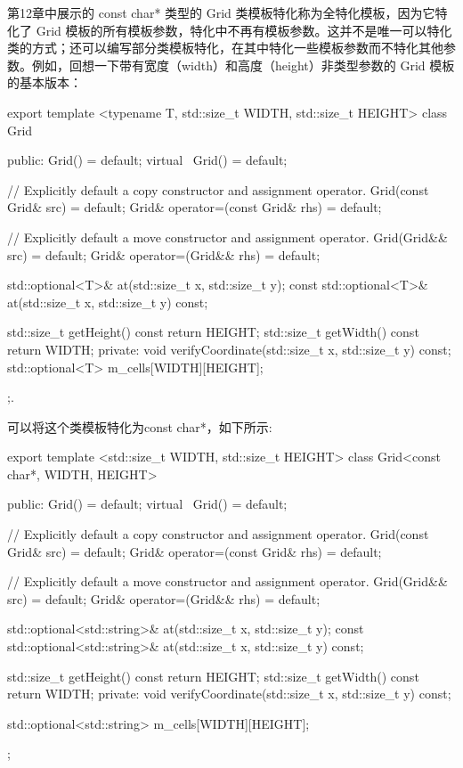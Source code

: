 第12章中展示的 const char* 类型的 Grid 类模板特化称为全特化模板，因为它特化了 Grid 模板的所有模板参数，特化中不再有模板参数。这并不是唯一可以特化类的方式；还可以编写部分类模板特化，在其中特化一些模板参数而不特化其他参数。例如，回想一下带有宽度（width）和高度（height）非类型参数的 Grid 模板的基本版本：

\begin{cpp}
export template <typename T, std::size_t WIDTH, std::size_t HEIGHT>
class Grid
{
    public:
        Grid() = default;
        virtual ~Grid() = default;

        // Explicitly default a copy constructor and assignment operator.
        Grid(const Grid& src) = default;
        Grid& operator=(const Grid& rhs) = default;

        // Explicitly default a move constructor and assignment operator.
        Grid(Grid&& src) = default;
        Grid& operator=(Grid&& rhs) = default;

        std::optional<T>& at(std::size_t x, std::size_t y);
        const std::optional<T>& at(std::size_t x, std::size_t y) const;

        std::size_t getHeight() const { return HEIGHT; }
        std::size_t getWidth() const { return WIDTH; }
    private:
        void verifyCoordinate(std::size_t x, std::size_t y) const;
        std::optional<T> m_cells[WIDTH][HEIGHT];
};.
\end{cpp}

可以将这个类模板特化为const char*，如下所示:

\begin{cpp}
export template <std::size_t WIDTH, std::size_t HEIGHT>
class Grid<const char*, WIDTH, HEIGHT>
{
    public:
        Grid() = default;
        virtual ~Grid() = default;

        // Explicitly default a copy constructor and assignment operator.
        Grid(const Grid& src) = default;
        Grid& operator=(const Grid& rhs) = default;

        // Explicitly default a move constructor and assignment operator.
        Grid(Grid&& src) = default;
        Grid& operator=(Grid&& rhs) = default;

        std::optional<std::string>& at(std::size_t x, std::size_t y);
        const std::optional<std::string>& at(std::size_t x, std::size_t y) const;

        std::size_t getHeight() const { return HEIGHT; }
        std::size_t getWidth() const { return WIDTH; }
    private:
        void verifyCoordinate(std::size_t x, std::size_t y) const;

        std::optional<std::string> m_cells[WIDTH][HEIGHT];
};
\end{cpp}

